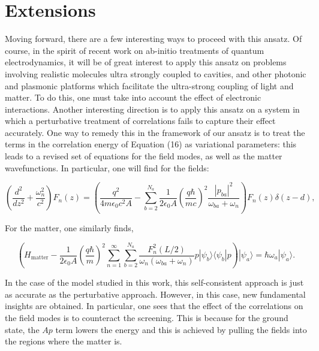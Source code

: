 \documentclass[aps,prb,twocolumn,
	groupedaddress,superscriptaddress,
	amsfonts,amssymb,amsmath,floatfix,
	citeautoscript]{revtex4-1}
\begin{document}
\section{Extensions}
\label{sec:extensions}
Moving forward, there are a few interesting ways to proceed with this ansatz. Of course, in the spirit of recent work on ab-initio treatments of quantum electrodynamics, it will be of great interest to apply this ansatz on problems involving realistic molecules ultra strongly coupled to cavities, and other photonic and plasmonic platforms which facilitate the ultra-strong coupling of light and matter. To do this, one must take into account the effect of electronic interactions. Another interesting direction is to apply this ansatz on a system in which a perturbative treatment of correlations fails to capture their effect accurately. One way to remedy this in the framework of our ansatz is to treat the terms in the correlation energy of Equation (16) as variational parameters: this leads to a revised set of equations for the field modes, as well as the matter wavefunctions. In particular, one will find for the fields:
\begin{widetext}
\begin{equation*}
\left(\frac{d^2}{dz^2} + \frac{\omega_n^2}{c^2} \right)F_n(z) = \left(\frac{q^2}{4m\epsilon_0 c^2 A} - \sum\limits_{b=2}^{N_a}\frac{1}{2\epsilon_0 A}\left( \frac{q\hbar}{mc}\right)^2\frac{|p_{ba}|^2}{\omega_{ba}+\omega_n}\right)F_n(z)\delta(z-d),
\end{equation*}
\end{widetext}
For the matter, one similarly finds,
\begin{widetext}
\begin{equation*}
\left(H_{\mathrm{matter}} - \frac{1}{2\epsilon_0 A}\left(\frac{q\hbar}{m}\right)^2\sum\limits_{n=1}^{\infty}\sum\limits_{b=2}^{N_a}\frac{F^2_n(L/2)}{\omega_n(\omega_{ba}+\omega_n)}p|\psi_b\rangle\langle \psi_b|p\right)|\psi_a\rangle = \hbar\omega_a|\psi_a\rangle.
\end{equation*}
\end{widetext}
In the case of the model studied in this work, this self-consistent approach is just as accurate as the perturbative approach. However, in this case, new fundamental insights are obtained. In particular, one sees that the effect of the correlations on the field modes is to counteract the screening. This is because for the ground state, the $Ap$ term lowers the energy and this is achieved by pulling the fields into the regions where the matter is.
\end{document}
